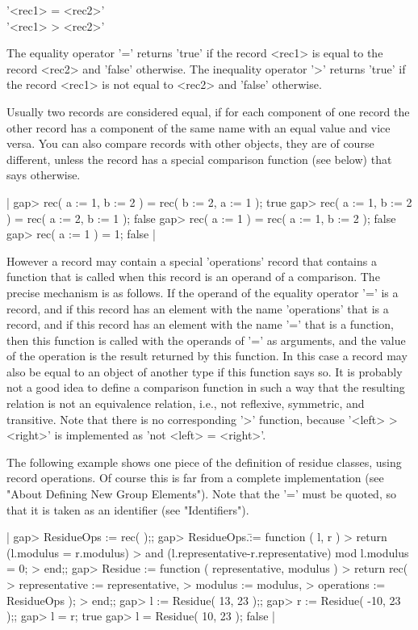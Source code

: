 '<rec1> = <rec2>' \\
'<rec1> \<> <rec2>'

The equality operator '=' returns 'true' if the record <rec1> is equal to
the  record <rec2> and 'false'  otherwise.  The inequality operator '\<>'
returns 'true' if  the record <rec1> is not  equal to <rec2> and  'false'
otherwise.

Usually two  records are considered equal, if  for  each component of one
record the other record  has a component of  the same name with  an equal
value and vice  versa.  You can  also compare records with other objects,
they are of course different, unless the  record has a special comparison
function (see below) that says otherwise.

|    gap> rec( a := 1, b := 2 ) = rec( b := 2, a := 1 );
    true
    gap> rec( a := 1, b := 2 ) = rec( a := 2, b := 1 );
    false
    gap> rec( a := 1 ) = rec( a := 1, b := 2 );
    false
    gap> rec( a := 1 ) = 1;
    false |

However a record may contain a  special 'operations' record that contains
a function that is called when this record is an operand of a comparison.
The precise mechanism   is as follows.   If  the operand of the  equality
operator '=' is a record, and if this record has an element with the name
'operations' that is a record, and if this record has an element with the
name '='  that  is a function,  then this   function is called   with the
operands of  '='  as arguments, and the  value  of the  operation  is the
result  returned  by this  function.  In this  case a  record may also be
equal to an object  of  another type if this  function  says so.   It  is
probably not a  good idea to define  a comparison function  in such a way
that the  resulting relation is  not  an equivalence  relation, i.e., not
reflexive,  symmetric,  and    transitive.   Note   that  there  is    no
corresponding '\<>' function, because '<left> \<> <right>' is implemented
as 'not <left> = <right>'.

The  following  example shows  one  piece of  the  definition  of residue
classes, using record operations.  Of course this  is far from a complete
implementation (see "About Defining New Group Elements").   Note that the
'='    must  be quoted,  so  that  it   is taken  as   an identifier (see
"Identifiers").

|    gap> ResidueOps := rec( );;
    gap> ResidueOps.\= := function ( l, r )
    >   return (l.modulus = r.modulus)
    >     and (l.representative-r.representative) mod l.modulus = 0;
    > end;;
    gap> Residue := function ( representative, modulus )
    >   return rec(
    >     representative := representative,
    >     modulus        := modulus,
    >     operations     := ResidueOps );
    > end;;
    gap> l := Residue( 13, 23 );;
    gap> r := Residue( -10, 23 );;
    gap> l = r;
    true
    gap> l = Residue( 10, 23 );
    false |

